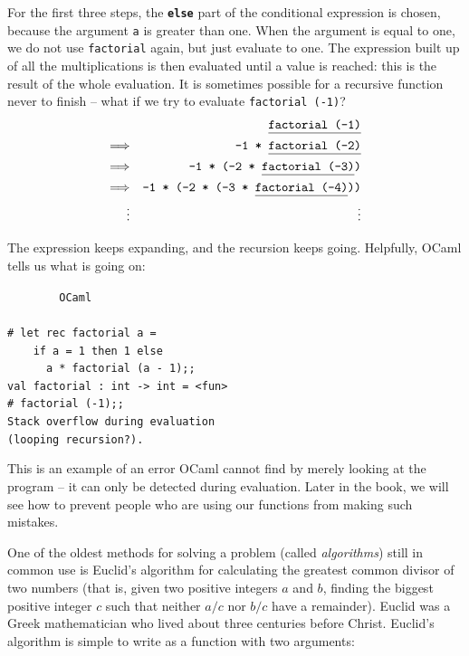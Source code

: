 \documentclass[]{book}
\newcommand{\smspace}{\vspace{4mm}}
\begin{document}
\noindent For the first three steps, the \textbf{\texttt{else}} part of the conditional expression is chosen, because the argument \texttt{a} is greater than one. When the argument is equal to one, we do not use \texttt{factorial} again, but just evaluate to one. The expression built up of all the multiplications is then evaluated until a value is reached: this is the result of the whole evaluation. It is sometimes possible for a recursive function never to finish -- what if we try to evaluate \texttt{factorial\! (-1)}?
\begin{eqnarray*}
 & & \texttt{\underline{\vphantom{g}factorial (-1)}} \\
 \Longrightarrow & & \texttt{-1 * \underline{\vphantom{g}factorial (-2)}} \\
 \Longrightarrow & & \texttt{-1 * (-2 * \underline{\vphantom{g}factorial (-3)})} \\
 \Longrightarrow & & \texttt{-1 * (-2 * (-3 * \underline{\vphantom{g}factorial (-4)}))}\\
 \vdots && \vdots
\end{eqnarray*}

\noindent The expression keeps expanding, and the recursion keeps going. Helpfully, OCaml tells us what is going on:

\smspace
\noindent\verb!        OCaml!\\
\noindent\\
\noindent\verb!# let rec factorial a =!\\
\noindent\verb!    if a = 1 then 1 else!\\
\noindent\verb!      a * factorial (a - 1);;!\\
\noindent\verb!val factorial : int -> int = <fun>!\\
\noindent\texttt{\# factorial (-1);;}\\
\noindent\verb!Stack overflow during evaluation!\\
\noindent\verb!(looping recursion?).!
\smspace

\noindent This is an example of an error OCaml cannot find by merely looking at the program -- it can only be detected during evaluation. Later in the book, we will see how to prevent people who are using our functions from making such mistakes.

One of the oldest methods for solving a problem (called \textit{algorithms}) still in common use is Euclid's algorithm for calculating the greatest common divisor of two numbers (that is, given two positive integers $a$ and $b$, finding the biggest positive integer $c$ such that neither $a / c$ nor $b / c$ have a remainder). Euclid was a Greek mathematician who lived about three centuries before Christ. Euclid's algorithm is simple to write as a function with two arguments:
\end{document}
